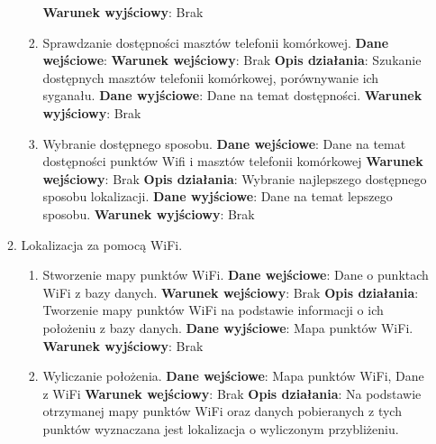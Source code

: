 \documentclass[11pt]{article}
\begin{document}
\begin{enumerate}
\begin{enumerate}[label*=\arabic*.]
\begin{enumerate}[label*=\arabic*.]
				\textbf{Warunek wyjściowy}: Brak
				\item Sprawdzanie dostępności masztów telefonii komórkowej. \newline
				\textbf{Dane wejściowe}: 	\newline
				\textbf{Warunek wejściowy}: Brak		\newline   	
				\textbf{Opis działania}: Szukanie dostępnych masztów telefonii komórkowej, porównywanie ich syganału.	\newline
				\textbf{Dane wyjściowe}: Dane na temat dostępności.	\newline
				\textbf{Warunek wyjściowy}: Brak
				\item Wybranie dostępnego sposobu. \newline
				\textbf{Dane wejściowe}: Dane na temat dostępności punktów Wifi i masztów telefonii komórkowej	\newline
				\textbf{Warunek wejściowy}: Brak		\newline   	
				\textbf{Opis działania}: Wybranie najlepszego dostępnego sposobu lokalizacji.	\newline
				\textbf{Dane wyjściowe}: Dane na temat lepszego sposobu.	\newline
				\textbf{Warunek wyjściowy}: Brak
			\end{enumerate}
			\item Lokalizacja za pomocą WiFi.
			\begin{enumerate}[label*=\arabic*.]
				\item Stworzenie mapy punktów WiFi. \newline
				\textbf{Dane wejściowe}: Dane o punktach WiFi z bazy danych.	\newline
				\textbf{Warunek wejściowy}: Brak	\newline   	
				\textbf{Opis działania}: Tworzenie mapy punktów WiFi na podstawie informacji o ich położeniu z bazy danych.	\newline
				\textbf{Dane wyjściowe}: Mapa punktów WiFi.	\newline
				\textbf{Warunek wyjściowy}: Brak
				\item Wyliczanie położenia. \newline
				\textbf{Dane wejściowe}: Mapa punktów WiFi, Dane z WiFi	\newline
				\textbf{Warunek wejściowy}: Brak		\newline   	
				\textbf{Opis działania}: Na podstawie otrzymanej mapy punktów WiFi oraz danych pobieranych z tych punktów wyznaczana jest lokalizacja o wyliczonym przybliżeniu.	\newline

\end{enumerate}
\end{enumerate}
\end{enumerate}
\end{document}
